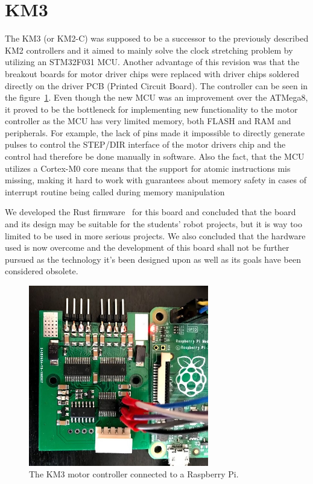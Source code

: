 \section{KM3}
\label{sec:km3}
The KM3 (or KM2-C) was supposed to be a successor to the previously described KM2 controllers and it aimed to mainly solve the clock stretching problem by utilizing an STM32F031 MCU.
Another advantage of this revision was that the breakout boards for motor driver chips were replaced with driver chips soldered directly on the driver PCB (Printed Circuit Board).
The controller can be seen in the figure~\ref{fig:km3}.
Even though the new MCU was an improvement over the ATMega8, it proved to be the bottleneck for implementing new functionality to the motor controller as the MCU has very limited memory, both FLASH and RAM and peripherals.
For example, the lack of pins made it impossible to directly generate pulses to control the STEP/DIR interface of the motor drivers chip and the control had therefore be done manually in software.
Also the fact, that the MCU utilizes a Cortex-M0 core means that the support for atomic instructions mis missing, making it hard to work with guarantees about memory safety in cases of interrupt routine being called during memory manipulation

We developed the Rust firmware~\cite{matous_hybl_robotics-butkm3-rs_2020} for this board and concluded that the board and its design may be suitable for the students' robot projects, but it is way too limited to be used in more serious projects.
We also concluded that the hardware used is now overcome and the development of this board shall not be further pursued as the technology it's been designed upon as well as its goals have been considered obsolete.

\begin{figure}[H]
    \centering
    \includegraphics[width=0.7\textwidth]{obrazky/km3}
    \caption{The KM3 motor controller connected to a Raspberry Pi.}
    \label{fig:km3}
\end{figure}

